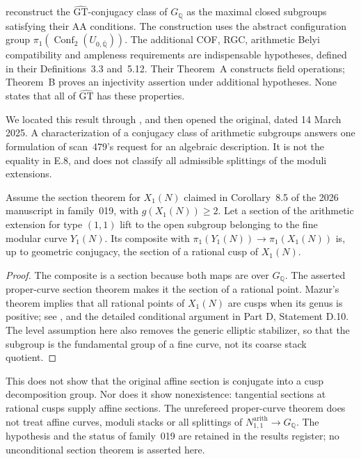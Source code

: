 \citet[Theorem~C(ii)]{HoshiMochizukiTsujimura2025} reconstruct the
$\widehat{\mathrm{GT}}$-conjugacy class of $G_{\mathbb Q}$ as the maximal
closed subgroups satisfying their AA conditions.  The construction uses
the abstract configuration group
$\pi_1(\operatorname{Conf}_2(U_{0,\overline{\mathbb Q}}))$.
The additional COF, RGC, arithmetic Belyi compatibility and ampleness
requirements are indispensable hypotheses, defined in their
Definitions~3.3 and~5.12.  Their Theorem~A constructs field operations;
Theorem~B proves an injectivity assertion under additional hypotheses.
None states that all of $\widehat{\mathrm{GT}}$ has these properties.

We located this result through \citet[\S4]{Collas2026}, and then opened
the original, dated 14 March 2025.  A characterization of a conjugacy
class of arithmetic subgroups answers one formulation of scan~479's
request for an algebraic description.  It is not the equality in E.8,
and does not classify all admissible splittings of the moduli extensions.

Assume the section theorem for $X_1(N)$ claimed in Corollary~8.5 of
the 2026 manuscript in family~019, with $g(X_1(N))\geq2$.
Let a section of the arithmetic extension for type $(1,1)$ lift to the
open subgroup belonging to the fine modular curve $Y_1(N)$.
Its composite with
$\pi_1(Y_1(N))\to\pi_1(X_1(N))$ is, up to geometric conjugacy, the
section of a rational cusp of $X_1(N)$.
\begin{proof}
The composite is a section because both maps are over $G_{\mathbb Q}$.
The asserted proper-curve section theorem makes it the section of a
rational point.  Mazur's theorem implies that all rational points of
$X_1(N)$ are cusps when its genus is positive; see
\citet[Introduction, Theorems~(7),(7')]{Mazur1977}, and the detailed
conditional argument in Part D, Statement D.10.  The level assumption
here also removes the generic elliptic stabilizer, so that the subgroup
is the fundamental group of a fine curve, not its coarse stack quotient.
\end{proof}
This does not show that the original affine section is conjugate into
a cusp decomposition group.  Nor does it show nonexistence: tangential
sections at rational cusps supply affine sections.  The unrefereed
proper-curve theorem does not treat affine curves, moduli stacks or all
splittings of $N^{\mathrm{arith}}_{1,1}\to G_{\mathbb Q}$.
The hypothesis and the status of family~019 are retained in the results
register; no unconditional section theorem is asserted here.

